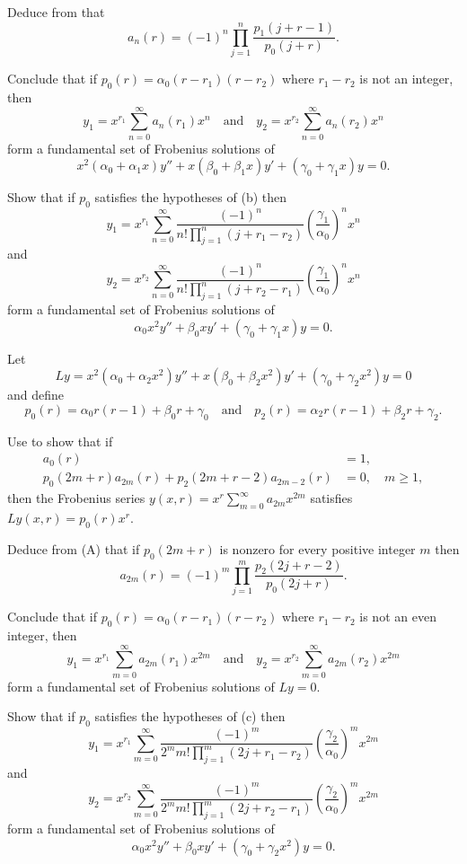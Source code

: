 \begin{exerciselist}
\item\label{exer:7.5.55}\begin{alist}
\item %
Deduce from  that
\[
a_n(r)=(-1)^n\prod_{j=1}^n\frac{p_1(j+r-1)}{p_0(j+r)}.
\]
\item %
Conclude that if $p_0(r)=\alpha_0(r-r_1)(r-r_2)$ where $r_1-r_2$
is not an integer, then
\[
y_1=x^{r_1}\sum_{n=0}^\infty a_n(r_1)x^n\quad\text{and}\quad
y_2=x^{r_2}\sum_{n=0}^\infty a_n(r_2)x^n
\]
 form a fundamental set of  Frobenius solutions of
\[
x^2(\alpha_0+\alpha_1x)y''+x(\beta_0+\beta_1x)y'+(\gamma_0+\gamma_1x)y=0.
\]
\item %
Show that if $p_0$ satisfies the hypotheses of (b) then
\[
y_1=x^{r_1}\sum_{n=0}^\infty\frac{(-1)^n}{n!\prod_{j=1}^n(j+r_1-r_2)}
\left(\frac{\gamma_1}{\alpha_0}\right)^nx^n
\]
and
\[
y_2=x^{r_2}\sum_{n=0}^\infty\frac{(-1)^n}{n!\prod_{j=1}^n(j+r_2-r_1)}
\left(\frac{\gamma_1}{\alpha_0}\right)^nx^n
\]
form a fundamental set of  Frobenius solutions of
\[
\alpha_0x^2y''+\beta_0xy'+(\gamma_0+\gamma_1x)y=0.
\]
\end{alist}

\item\label{exer:7.5.56}Let
\[
Ly=x^2(\alpha_0+\alpha_2x^2)y''+x(\beta_0+\beta_2x^2)y'+
(\gamma_0+\gamma_2x^2)y=0
\]
and define
\[
p_0(r)=\alpha_0r(r-1)+\beta_0r+\gamma_0\quad\text{and}\quad
p_2(r)=\alpha_2r(r-1)+\beta_2r+\gamma_2.
\]
\begin{alist}
\item %
Use  to show that if
\[\tag{A}
\begin{aligned}
a_0(r)&=1,\\
p_0(2m+r)a_{2m}(r)+p_2(2m+r-2)a_{2m-2}(r)&=0,\quad m\ge1,
\end{aligned}
\]
then the Frobenius series
 $y(x,r)=x^r\sum_{m=0}^\infty a_{2m}x^{2m}$ satisfies
$Ly(x,r)=p_0(r)x^r$.
\item %
Deduce from (A) that  if $p_0(2m+r)$ is nonzero
for every positive integer $m$ then
\[
a_{2m}(r)=(-1)^m\prod_{j=1}^m\frac{p_2(2j+r-2)}{p_0(2j+r)}.
\]
\item %
Conclude that if $p_0(r)=\alpha_0(r-r_1)(r-r_2)$ where $r_1-r_2$
is not an even integer, then
\[
y_1=x^{r_1}\sum_{m=0}^\infty a_{2m}(r_1)x^{2m}\quad\text{and}\quad
y_2=x^{r_2}\sum_{m=0}^\infty a_{2m}(r_2)x^{2m}
\]
form a fundamental set of  Frobenius solutions of $Ly=0$.
\item %
Show that if $p_0$ satisfies the hypotheses of (c) then
\[
y_1=x^{r_1}\sum_{m=0}^\infty\frac{(-1)^m}{2^mm!\prod_{j=1}^m(2j+r_1-r_2)}
\left(\frac{\gamma_2}{\alpha_0}\right)^mx^{2m}
\]
and
\[
y_2=x^{r_2}\sum_{m=0}^\infty\frac{(-1)^m}{2^mm!\prod_{j=1}^m(2j+r_2-r_1)}
\left(\frac{\gamma_2}{\alpha_0}\right)^mx^{2m}
\]
form a fundamental set of  Frobenius solutions of
\[
\alpha_0x^2y''+\beta_0xy'+(\gamma_0+\gamma_2x^2)y=0.
\]
\end{alist}


\end{exerciselist}
